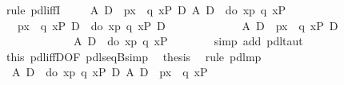 \begin{isabellebody}
\isamarkupfalse%
\ {\isacharparenleft}rule\ pdl{\isacharunderscore}iffI{\isacharparenright}\isanewline
\ \ \isamarkupfalse%
\ {\isachardoublequote}{\isasymturnstile}\ {\isacharparenleft}A\ {\isasymlongrightarrow}\isactrlsub D\ {\isacharbrackleft}{\isacharhash}\ p{\isacharbrackright}{\isacharparenleft}{\isasymlambda}x{\isachardot}\ {\isacharbrackleft}{\isacharhash}\ q\ x{\isacharbrackright}P{\isacharparenright}{\isacharparenright}\ {\isasymlongrightarrow}\isactrlsub D\ A\ {\isasymlongrightarrow}\isactrlsub D\ {\isacharbrackleft}{\isacharhash}\ do\ {\isacharbraceleft}x{\isasymleftarrow}p{\isacharsemicolon}\ q\ x{\isacharbraceright}{\isacharbrackright}P{\isachardoublequote}\isanewline
\ \ \isamarkupfalse%
\ {\isacharminus}\isanewline
\ \ \ \ \isamarkupfalse%
\ {\isachardoublequote}{\isasymturnstile}\ {\isacharparenleft}{\isacharbrackleft}{\isacharhash}\ p{\isacharbrackright}{\isacharparenleft}{\isasymlambda}x{\isachardot}\ {\isacharbrackleft}{\isacharhash}\ q\ x{\isacharbrackright}P{\isacharparenright}\ {\isasymlongrightarrow}\isactrlsub D\ {\isacharbrackleft}{\isacharhash}\ do\ {\isacharbraceleft}x{\isasymleftarrow}p{\isacharsemicolon}\ q\ x{\isacharbraceright}{\isacharbrackright}P{\isacharparenright}\ {\isasymlongrightarrow}\isactrlsub D\isanewline
\ \ \ \ \ \ \ \ \ \ \ \ \ {\isacharparenleft}A\ {\isasymlongrightarrow}\isactrlsub D\ {\isacharbrackleft}{\isacharhash}\ p{\isacharbrackright}{\isacharparenleft}{\isasymlambda}x{\isachardot}\ {\isacharbrackleft}{\isacharhash}\ q\ x{\isacharbrackright}P{\isacharparenright}{\isacharparenright}\ {\isasymlongrightarrow}\isactrlsub D\isanewline
\ \ \ \ \ \ \ \ \ \ \ \ \ {\isacharparenleft}A\ {\isasymlongrightarrow}\isactrlsub D\ {\isacharbrackleft}{\isacharhash}\ do\ {\isacharbraceleft}x{\isasymleftarrow}p{\isacharsemicolon}\ q\ x{\isacharbraceright}{\isacharbrackright}P{\isacharparenright}{\isachardoublequote}\isanewline
\ \ \ \ \ \ \isamarkupfalse%
\ {\isacharparenleft}simp\ add{\isacharcolon}\ pdl{\isacharunderscore}taut{\isacharparenright}\isanewline
\ \ \ \ \isamarkupfalse%
\ this\ pdl{\isacharunderscore}iffD{}{\isacharbrackleft}OF\ pdl{\isacharunderscore}seqB{\isacharunderscore}simp{\isacharbrackright}\ \isamarkupfalse%
\ {\isacharquery}thesis\ \isamarkupfalse%
\ {\isacharparenleft}rule\ pdl{\isacharunderscore}mp{\isacharparenright}\isanewline
\ \ \isamarkupfalse%
\isanewline
\isamarkupfalse%
\isanewline
\ \ \isamarkupfalse%
\ {\isachardoublequote}{\isasymturnstile}\ {\isacharparenleft}A\ {\isasymlongrightarrow}\isactrlsub D\ {\isacharbrackleft}{\isacharhash}\ do\ {\isacharbraceleft}x{\isasymleftarrow}p{\isacharsemicolon}\ q\ x{\isacharbraceright}{\isacharbrackright}P{\isacharparenright}\ {\isasymlongrightarrow}\isactrlsub D\ A\ {\isasymlongrightarrow}\isactrlsub D\ {\isacharbrackleft}{\isacharhash}\ p{\isacharbrackright}{\isacharparenleft}{\isasymlambda}x{\isachardot}\ {\isacharbrackleft}{\isacharhash}\ q\ x{\isacharbrackright}P{\isacharparenright}{\isachardoublequote}\isanewline

\end{isabellebody}
